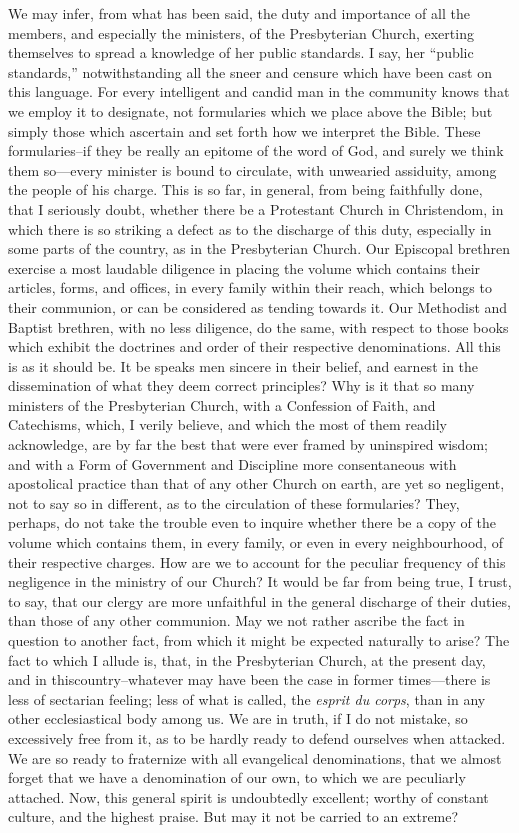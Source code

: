 \documentclass[
]{book}
\begin{document}
We may infer, from what has been said, the duty and importance of all the members, and especially the ministers, of the Presbyterian Church, exerting themselves to spread a knowledge of her public standards. I say, her ``public standards,'' notwithstanding all the sneer and censure which have been cast on this language. For every intelligent and candid man in the community knows that we employ it to designate, not formularies which we place above the Bible; but simply those which ascertain and set forth how we interpret the Bible. These formularies--if they be really an epitome of the word of God, and surely we think them so---every minister is bound to circulate, with unwearied assiduity, among the people of his charge. This is so far, in general, from being faithfully done, that I seriously doubt, whether there be a Protestant Church in Christendom, in which there is so striking a defect as to the discharge of this duty, especially in some parts of the country, as in the Presbyterian Church. Our Episcopal brethren exercise a most laudable diligence in placing the volume which contains their articles, forms, and offices, in every family within their reach, which belongs to their communion, or can be considered as tending towards it. Our Methodist and Baptist brethren, with no less diligence, do the same, with respect to those books which exhibit the doctrines and order of their respective denominations. All this is as it should be. It be speaks men sincere in their belief, and earnest in the dissemination of what they deem correct principles? Why is it that so many ministers of the Presbyterian Church, with a Confession of Faith, and Catechisms, which, I verily believe, and which the most of them readily acknowledge, are by far the best that were ever framed by uninspired wisdom; and with a Form of Government and Discipline more consentaneous with apostolical practice than that of any other Church on earth, are yet so negligent, not to say so in different, as to the circulation of these formularies? They, perhaps, do not take the trouble even to inquire whether there be a copy of the volume which contains them, in every family, or even in every neighbourhood, of their respective charges. How are we to account for the peculiar frequency of this negligence in the ministry of our Church? It would be far from being true, I trust, to say, that our clergy are more unfaithful in the general discharge of their duties, than those of any other communion. May we not rather ascribe the fact in question to another fact, from which it might be expected naturally to arise? The fact to which I allude is, that, in the Presbyterian Church, at the present day, and in thiscountry--whatever may have been the case in former times---there is less of sectarian feeling; less of what is called, the \emph{esprit du corps}, than in any other ecclesiastical body among us. We are in truth, if I do not mistake, so excessively free from it, as to be hardly ready to defend ourselves when attacked. We are so ready to fraternize with all evangelical denominations, that we almost forget that we have a denomination of our own, to which we are peculiarly attached. Now, this general spirit is undoubtedly excellent; worthy of constant culture, and the highest praise. But may it not be carried to an extreme? 
\end{document}
